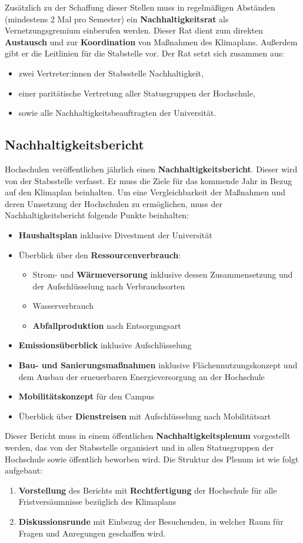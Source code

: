 \documentclass[DIV=calc]{scrartcl}
\begin{document}
Zusätzlich zu der Schaffung dieser Stellen muss in regelmäßigen Abständen (mindestens 2 Mal pro Semester) ein \textbf{Nachhaltigkeitsrat} als Vernetzungsgremium einberufen werden. Dieser Rat dient zum direkten \textbf{Austausch} und zur \textbf{Koordination} von Maßnahmen des Klimaplans. Außerdem gibt er die Leitlinien für die Stabstelle vor. Der Rat setzt sich zusammen aus:
\begin{itemize}
    \item zwei Vertreter:innen der Stabsstelle Nachhaltigkeit, 
    \item einer paritätische Vertretung aller Statusgruppen der Hochschule,
    \item sowie alle Nachhaltigkeitsbeauftragten der Universität.
\end{itemize}
\subsection*{Nachhaltigkeitsbericht}
Hochschulen veröffentlichen jährlich einen \textbf{Nachhaltigkeitsbericht}. Dieser wird von der Stabsstelle verfasst. Er muss die Ziele für das kommende Jahr in Bezug auf den Klimaplan beinhalten. Um eine Vergleichbarkeit der Maßnahmen und deren Umsetzung der Hochschulen zu ermöglichen, muss der Nachhaltigkeitsbericht folgende Punkte beinhalten:
\begin{itemize}
    \item \textbf{Haushaltsplan} inklusive Divestment der Universität
\item  Überblick über den \textbf{Ressourcenverbrauch}:
    \begin{itemize}
        \item Strom- und \textbf{Wärmeversorung} inklusive dessen Zusammensetzung und der Aufschlüsselung nach Verbrauchsorten
        \item Wasserverbrauch
        \item \textbf{Abfallproduktion} nach Entsorgungsart
    \end{itemize}
\item \textbf{Emissionsüberblick} inklusive Aufschlüsselung
\item \textbf{Bau- und Sanierungsmaßnahmen} inklusive Flächennutzungskonzept und dem Ausbau der erneuerbaren Energieversorgung an der Hochschule
\item \textbf{Mobilitätskonzept} für den Campus
\item Überblick über \textbf{Dienstreisen} mit Aufschlüsselung nach Mobilitätsart
\end{itemize}
Dieser Bericht muss in einem öffentlichen \textbf{Nachhaltigkeitsplenum} vorgestellt werden, das von der Stabsstelle organisiert und in allen Statusgruppen der Hochschule sowie öffentlich beworben wird. Die Struktur des Plenum ist wie folgt aufgebaut: 
\begin{enumerate}
    \item \textbf{Vorstellung} des Berichts mit \textbf{Rechtfertigung} der Hochschule für alle Fristversäumnisse bezüglich des Klimaplans
    \item \textbf{Diskussionsrunde} mit Einbezug der Besuchenden, in welcher Raum für Fragen und Anregungen geschaffen wird.
\end{enumerate}
\end{document}
